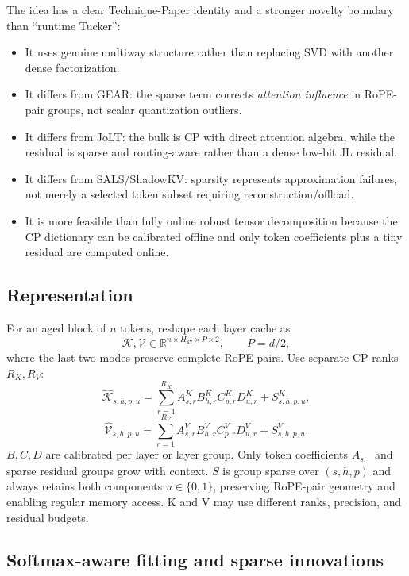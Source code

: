 \documentclass[10pt]{article}
\newcommand{\R}{\mathbb{R}}
\begin{document}
The idea has a clear Technique-Paper identity and a stronger novelty boundary than ``runtime
Tucker'':

\begin{itemize}[leftmargin=1.5em,itemsep=2pt]
\item It uses genuine multiway structure rather than replacing SVD with another dense
factorization.
\item It differs from GEAR: the sparse term corrects \emph{attention influence} in RoPE-pair
groups, not scalar quantization outliers.
\item It differs from JoLT: the bulk is CP with direct attention algebra, while the residual is
sparse and routing-aware rather than a dense low-bit JL residual.
\item It differs from SALS/ShadowKV: sparsity represents approximation failures, not merely a
selected token subset requiring reconstruction/offload.
\item It is more feasible than fully online robust tensor decomposition because the CP dictionary
can be calibrated offline and only token coefficients plus a tiny residual are computed online.
\end{itemize}

\subsection{Representation}

For an aged block of $n$ tokens, reshape each layer cache as
\[
\mathcal K,\mathcal V\in\R^{n\times H_{\mathrm{kv}}\times P\times 2},\qquad P=d/2,
\]
where the last two modes preserve complete RoPE pairs. Use separate CP ranks $R_K,R_V$:
\[
\widehat{\mathcal K}_{s,h,p,u}
=\sum_{r=1}^{R_K} A^K_{s,r}B^K_{h,r}C^K_{p,r}D^K_{u,r}+S^K_{s,h,p,u},
\]
\[
\widehat{\mathcal V}_{s,h,p,u}
=\sum_{r=1}^{R_V} A^V_{s,r}B^V_{h,r}C^V_{p,r}D^V_{u,r}+S^V_{s,h,p,u}.
\]
$B,C,D$ are calibrated per layer or layer group. Only token coefficients $A_{s,:}$ and sparse
residual groups grow with context. $S$ is group sparse over $(s,h,p)$ and always retains both
components $u\in\{0,1\}$, preserving RoPE-pair geometry and enabling regular memory access.
K and V may use different ranks, precision, and residual budgets.

\subsection{Softmax-aware fitting and sparse innovations}
\end{document}
